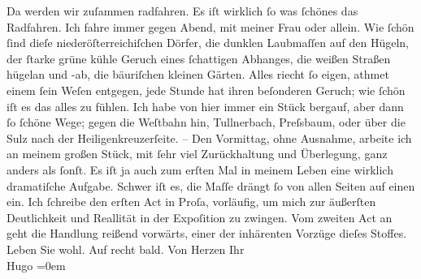 \begin{ledgroupsized}[t]{13cm}
           Da werden wir zuſammen radfahren. Es iſt wirklich ſo was ſchönes das Radfahren. Ich
               fahre immer gegen Abend, mit meiner Frau oder allein. Wie ſchön ſind dieſe niederöſterreichiſchen Dörfer, die dunklen Laubmaſſen auf den Hügeln, der
               ſtarke grüne kühle Geruch eines ſchattigen Abhanges, die weißen Straßen hügelan und
               -ab, die bäuriſchen kleinen Gärten. Alles riecht ſo eigen, athmet einem ſein {\pb}Weſen entgegen, jede Stunde hat
               ihren beſonderen Geruch; wie ſchön iſt es das alles zu fühlen.\pend
           \pstart
           Ich habe von hier immer ein Stück bergauf, aber dann ſo ſchöne Wege; gegen die Weſtbahn hin, Tullnerbach, Preſsbaum, oder über die Sulz nach der Heiligenkreuzerſeite.\pend
           \pstart
           \numberlinefalse{}–\numberlinetrue{}\pend
           \pstart
           Den Vormittag, ohne Ausnahme, arbeite ich an meinem großen Stück, mit ſehr viel Zurückhaltung und
               Überlegung, ganz anders als ſonſt. Es iſt {\pb}ja auch zum erſten Mal in meinem
               Leben eine wirklich dramatiſche Aufgabe. Schwer iſt es, die Maſſe drängt ſo von allen
               Seiten auf einen ein. Ich ſchreibe den erſten Act in Proſa, vorläufig, um mich zur
               äußerſten Deutlichkeit und Reallität in der Expoſition zu zwingen.\pend
           \pstart
           Vom zweiten Act an geht die Handlung reißend vorwärts, einer der inhärenten Vorzüge
               dieſes Stoffes.\pend
           \pstart
           Leben Sie wohl. Auf recht bald.\pend
           \pstart
           Von Herzen Ihr{\\[\baselineskip]}\spacefill\mbox{Hugo}\pend
           \leftskip=0em{}\endnumbering{}\end{ledgroupsized}  \newcommand{\dateiname}{L01161}\newcommand{\titel}{Hugo von Hofmannsthal an Arthur Schnitzler, 12. 8. [1901]}\newcommand{\editorInnen}{Martin Anton Müller und Gerd-Hermann Susen}
      